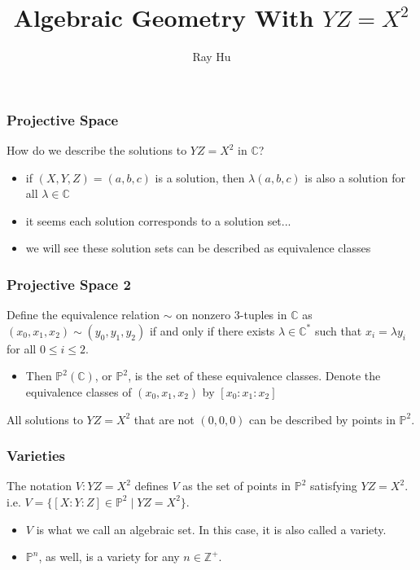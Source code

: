 \documentclass{beamer}
\title{Algebraic Geometry With \(YZ = X^2\)}
\author{Ray Hu}
\date{}
\theoremstyle{definition}
\begin{document}
\maketitle
\begin{frame}
    \frametitle{Projective Space}
How do we describe the solutions to \(YZ = X^2\) in \(\mathbb{C}\)?
      \begin{itemize}
          \item[\textrightarrow] if \((X, Y, Z) = (a, b, c)\) is a solution, then \(\lambda (a, b, c)\) is also a solution for all \(\lambda \in \mathbb{C}\)
          \item[\textrightarrow] it seems each solution corresponds to a solution set...
        \item[\textrightarrow] we will see these solution sets can be described as equivalence classes

        \end{itemize}

    \end{frame}
    \begin{frame}

        \frametitle{Projective Space 2}
        Define the equivalence relation \(\sim\) on nonzero \(3\)-tuples in \(\mathbb{C}\) as \((x_0, x_1, x_{2}) \sim (y_0, y_1, y_{2})\) if and only if there exists \(\lambda \in \mathbb{C}^\ast\) such that \(x_i = \lambda y_i\) for all \(0\leq i\leq 2\).
        \begin{itemize}
            \item[\textrightarrow] Then \(\mathbb{P}^2(\mathbb{C})\), or \(\mathbb{P}^2\), is the set of these equivalence classes. Denote the equivalence classes of \((x_0, x_1, x_2)\) by \([x_0: x_1: x_2]\)
 \end{itemize}

 All solutions to \(YZ = X^2\) that are not \((0, 0, 0)\) can be described by points in \(\mathbb{P}^2\).
\end{frame}

\begin{frame}
    \frametitle{Varieties}
    The notation \(V: YZ = X^2\) defines \(V\) as the set of points in \(\mathbb{P}^2\) satisfying \(YZ = X^2\). i.e. \(V = \{[X:Y:Z]\in \mathbb{P}^2 \mid YZ = X^2 \}\).
\begin{itemize}
    \item[\textrightarrow] \(V\) is what we call an algebraic set. In this case, it is also called a variety.
    \item[\textrightarrow] \(\mathbb{P}^n\), as well, is a variety for any \(n\in \mathbb{Z}^+\).

\end{itemize}
\end{frame}
\end{document}

